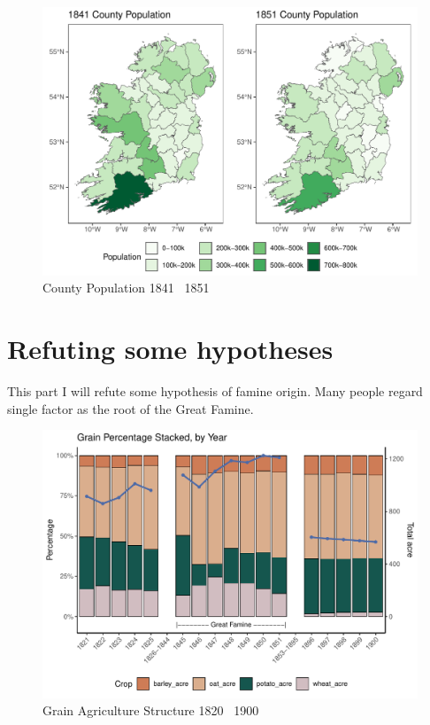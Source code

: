 \begin{figure}[h]
    \centering
    \caption{County Population 1841 \textendash\ 1851}
    \includegraphics[width=.95\textwidth]{../03_outputs/map1841_1851.pdf}
\end{figure}


\section{Refuting some hypotheses}

This part I will refute some hypothesis of famine origin. Many people regard single factor as the root of the Great Famine.

\begin{figure}[h]
    \centering
    \caption{Grain Agriculture Structure 1820 \textendash\ 1900}
    \includegraphics[width=.95\textwidth]{../03_outputs/food_structure.pdf}
\end{figure}

